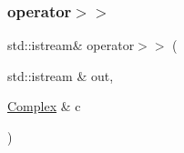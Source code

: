 \mbox{\label{classComplex_a4c3792c8f6bd0778d0607c3a161e9eb6}} 
\subsubsection{\texorpdfstring{operator$>$$>$}{operator>>}}
{\footnotesize\ttfamily std\+::istream\& operator$>$$>$ (\begin{DoxyParamCaption}\item[{std\+::istream \&}]{out,  }\item[{\mbox{\hyperlink{classComplex}{Complex}} \&}]{c }\end{DoxyParamCaption})\hspace{0.3cm}{\ttfamily [friend]}}

